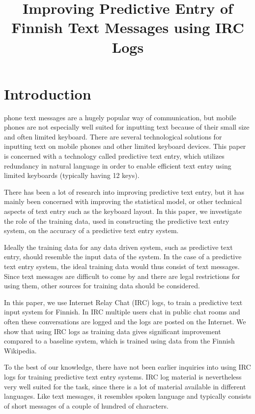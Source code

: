 \documentclass[a4paper,conference]{IEEEtran}
\title{Improving Predictive Entry of Finnish Text Messages using IRC Logs}
\author{
\IEEEauthorblockA{\ldots\\
\ldots\\
\ldots\\
\ldots}
\and
\IEEEauthorblockA{\ldots\\
\ldots\\
\ldots\\
\ldots}
\and
\IEEEauthorblockA{\ldots\\
\ldots\\
\ldots\\
\ldots}
}
\begin{document}
\maketitle


\begin{abstract}

\end{abstract}

\section{Introduction}
\label{sec:introduction}

 phone text messages are a hugely popular way
of communication, but mobile phones are not especially well suited for
inputting text because of their small size and often limited
keyboard. There are several technological solutions for inputting text
on mobile phones and other limited keyboard devices. This paper is
concerned with a technology called predictive text entry, which utilizes
redundancy in natural language in order to enable efficient text entry
using limited keyboards (typically having 12 keys).

There has been a lot of research into improving predictive text entry,
but it has mainly been concerned with improving the statistical model,
or other technical aspects of text entry such as the keyboard
layout. In this paper, we investigate the role of the training data,
used in constructing the predictive text entry system, on the accuracy
of a predictive text entry system.

Ideally the training data for any data driven system, such as
predictive text entry, should resemble the input data of the
system. In the case of a predictive text entry system, the ideal
training data would thus consist of text messages. Since text messages
are difficult to come by and there are legal restrictions for using
them, other sources for training data should be considered. 

In this paper, we use Internet Relay Chat (IRC) logs, to train a
predictive text input system for Finnish. In IRC multiple users chat
in public chat rooms and often these conversations are logged and the
logs are posted on the Internet. We show that using IRC logs as
training data gives significant improvement compared to a baseline
system, which is trained using data from the Finnish Wikipedia.

To the best of our knowledge, there have not been earlier inquiries
into using IRC logs for training predictive text entry systems. IRC
log material is nevertheless very well suited for the task, since
there is a lot of material available in different languages. Like text
messages, it resembles spoken language and typically consists of short
messages of a couple of hundred of characters.
\end{document}
